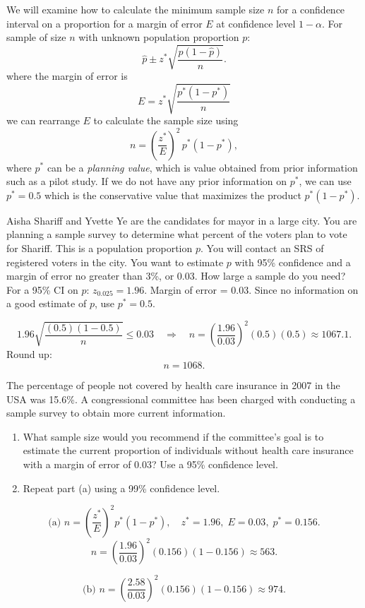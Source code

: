 We will examine how to calculate the minimum sample size $n$ for a confidence interval on a proportion for a margin of error $E$ at confidence level $1-\alpha$.
For sample of size \(n\) with unknown population proportion \(p\):
\[
\hat p \pm z^* \sqrt{ \displaystyle \frac{\hat p(1-\hat p)}{n}}.
\]
where the margin of error is
\[
E=z^*\sqrt{ \displaystyle \frac{p^*(1-p^*)}{n}}
\]
we can rearrange $E$ to calculate the sample size using
\[
n = \left( \displaystyle \frac{z^*}{E} \right)^2\,p^*(1-p^*),
\]
where \(p^*\) can be a \emph{planning value}, which is value obtained from prior information such as a pilot study.
If we do not have any prior information on \(p^*\), we can use \(p^* = 0.5\) which is the conservative value that maximizes the product $p^*(1-p^*)$.




\begin{example}
Aisha Shariff and Yvette Ye are the candidates for mayor in a large city. You are planning a sample survey to determine what percent of the voters plan to vote for Shariff. This is a population proportion \(p\). You will contact an SRS of registered voters in the city. You want to estimate \(p\) with 95\% confidence and a margin of error no greater than 3\%, or 0.03. How large a sample do you need?\\


For a 95\% CI on \(p\): \(z_{0.025} = 1.96\). Margin of error = 0.03. Since no information on a good estimate of \(p\), use \(p^{*} = 0.5\).

\[
1.96 \sqrt{\frac{(0.5)(1 - 0.5)}{n}} \le 0.03
\quad\Longrightarrow\quad
n = \left(\frac{1.96}{0.03}\right)^{2} (0.5)(0.5) \approx 1067.1.
\]
Round up:
\[
n = 1068.
\]

\end{example}






\begin{example}
The percentage of people not covered by health care insurance in 2007 in the USA was 15.6\%. A congressional committee has been charged with conducting a sample survey to obtain more current information.
\begin{enumerate}
    \item What sample size would you recommend if the committee’s goal is to estimate the current proportion of individuals without health care insurance with a margin of error of 0.03? Use a 95\% confidence level.
    \item Repeat part (a) using a 99\% confidence level.
\end{enumerate}


\[
\text{(a) } n 
= 
\left(\frac{z^{*}}{E}\right)^{2}
p^{*}(1-p^{*}), 
\quad z^{*} = 1.96, \; E = 0.03,\; p^{*} = 0.156.
\]
\[
n
=
\left(\frac{1.96}{0.03}\right)^{2}
(0.156)(1 - 0.156)
\approx 563.
\]

\[
\text{(b) } n 
= 
\left(\frac{2.58}{0.03}\right)^{2}
(0.156)(1 - 0.156)
\approx 974.
\]

\end{example}




